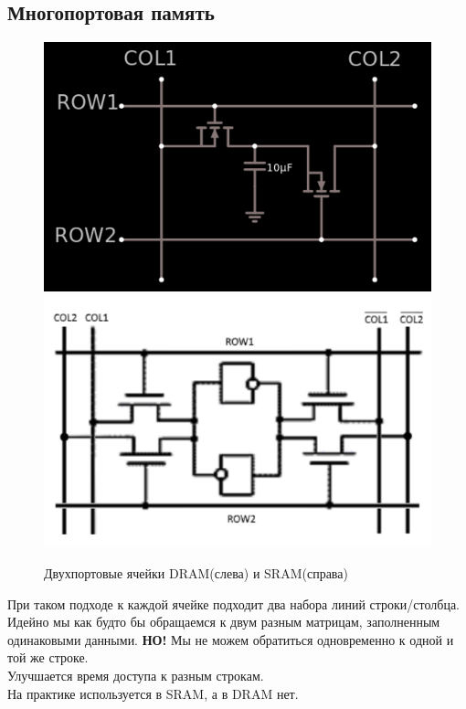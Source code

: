 \documentclass[12pt, a4paper]{article}
\begin{document}
\subsection{Многопортовая память}
\begin{figure}[h]
    \centering
    \includegraphics[scale=0.3]{./images/MultiportDRAM.png}
    \includegraphics[scale=0.3]{./images/MultiportSRAM.png}
    \caption{Двухпортовые ячейки DRAM(слева) и SRAM(справа)}
    \label{fig:MultiportMEM}
\end{figure}
При таком подходе к каждой ячейке подходит два набора линий строки/столбца.\\
Идейно мы как будто бы обращаемся к двум разным матрицам, заполненным одинаковыми данными. \textbf{НО!} Мы не можем обратиться одновременно к одной и той же строке.\\
Улучшается время доступа к разным строкам.\\
На практике используется в SRAM, а в DRAM нет.
\end{document}
